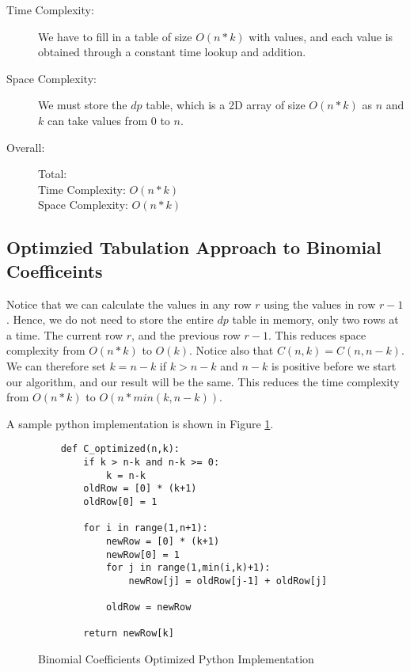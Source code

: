 \begin{description}
    \item[Time Complexity:]
        We have to fill in a table of size $O(n * k)$ with values, and each value is obtained through a constant time lookup and addition.

    \item[Space Complexity:] 
        We must store the $dp$ table, which is a 2D array of size $O(n * k)$ as $n$ and $k$ can take values from $0$ to $n$.
        
    \item[Overall:] Total:\\
        Time Complexity: $O(n * k)$\\
        Space Complexity: $O(n * k)$
    
\end{description}

\subsection{Optimzied Tabulation Approach to Binomial Coefficeints}
Notice that we can calculate the values in any row $r$ using the values in row $r-1$.
Hence, we do not need to store the entire $dp$ table in memory, only two rows at a time.
The current row $r$, and the previous row $r-1$.
This reduces space complexity from $O(n * k)$ to $O(k)$.
Notice also that $C(n,k) = C(n,n-k)$.
We can therefore set $k = n-k$ if $k > n-k$ and $n-k$ is positive before we start our algorithm, and our result will be the same.
This reduces the time complexity from $O(n * k)$ to $O(n * min(k,n-k))$.

A sample python implementation is shown in Figure \ref{fig:binomial-optimized}.

\begin{figure}[H]
    \centering
    \begin{lstlisting}
    def C_optimized(n,k):
        if k > n-k and n-k >= 0:
            k = n-k
        oldRow = [0] * (k+1)
        oldRow[0] = 1
    
        for i in range(1,n+1):
            newRow = [0] * (k+1)
            newRow[0] = 1
            for j in range(1,min(i,k)+1):
                newRow[j] = oldRow[j-1] + oldRow[j]
    
            oldRow = newRow
              
        return newRow[k]
    \end{lstlisting}
    \caption{Binomial Coefficients Optimized Python Implementation}
    \label{fig:binomial-optimized}
\end{figure}


